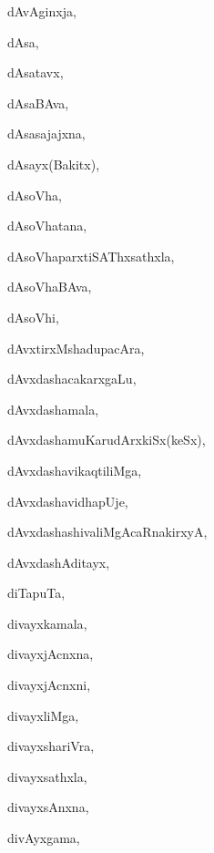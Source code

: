 \begin{multicols}{3}
{\noindent
{dAvAginxja}, \pageref{dAvAginxja}

\noindent
{dAsa}, \pageref{dAsa}

\noindent
{dAsatavx}, \pageref{dAsatavx}

\noindent
{dAsaBAva}, \pageref{dAsaBAva}

\noindent
{dAsasajajxna}, \pageref{dAsasajajxna}

\noindent
{dAsayx(Bakitx)}, \pageref{dAsayxBakitx}

\noindent
{dAsoVha}, \pageref{dAsoVha}

\noindent
{dAsoVhatana}, \pageref{dAsoVhatana}

\noindent
{dAsoVhaparxtiSAThxsathxla}, \pageref{dAsoVhaparxtiSAThxsathxla}

\noindent
{dAsoVhaBAva}, \pageref{dAsoVhaBAva}

\noindent
{dAsoVhi}, \pageref{dAsoVhi}

\noindent
{dAvxtirxMshadupacAra}, \pageref{dAvxtirxMshadupacAra}

\noindent
{dAvxdashacakarx\-gaLu}, \pageref{dAvxdashacakarxgaLu}

\noindent
{dAvxdashamala}, \pageref{dAvxdashamala}

\noindent
{dAvxdashamuKarudArxkiSx(keSx)}, \pageref{dAvxdashamuKarudArxkiSxkeSx}

\noindent
{dAvxdashavikaqtiliMga}, \pageref{dAvxdashavikaqtiliMga}

\noindent
{dAvxdashavidhapUje}, \pageref{dAvxdashavidhapUje}

\noindent
{dAvxdashashivaliMgAcaRnakirxyA}, \pageref{dAvxdashashivaliMgAcaRnakirxyA}

\noindent
{dAvxdashAditayx}, \pageref{dAvxdashAditayx}

\noindent
{diTapuTa}, \pageref{diTapuTa}

\noindent
{divayxkamala}, \pageref{divayxkamala}

\noindent
{divayxjAcnxna}, \pageref{divayxjAcnxna}

\noindent
{divayxjAcnxni}, \pageref{divayxjAcnxni}

\noindent
{divayxliMga}, \pageref{divayxliMga}

\noindent
{divayxshariVra}, \pageref{divayxshariVra}

\noindent
{divayxsathxla}, \pageref{divayxsathxla}

\noindent
{divayxsAnxna}, \pageref{divayxsAnxna}

\noindent
{divAyxgama}, \pageref{divAyxgama}

}
\end{multicols}
